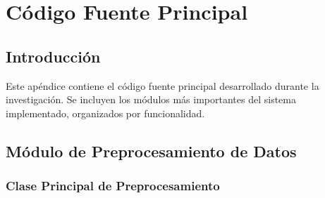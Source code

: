 
\chapter{Código Fuente Principal}
\label{apendice:codigo}

\section{Introducción}

Este apéndice contiene el código fuente principal desarrollado durante la investigación. Se incluyen los módulos más importantes del sistema implementado, organizados por funcionalidad.

\section{Módulo de Preprocesamiento de Datos}

\subsection{Clase Principal de Preprocesamiento}

